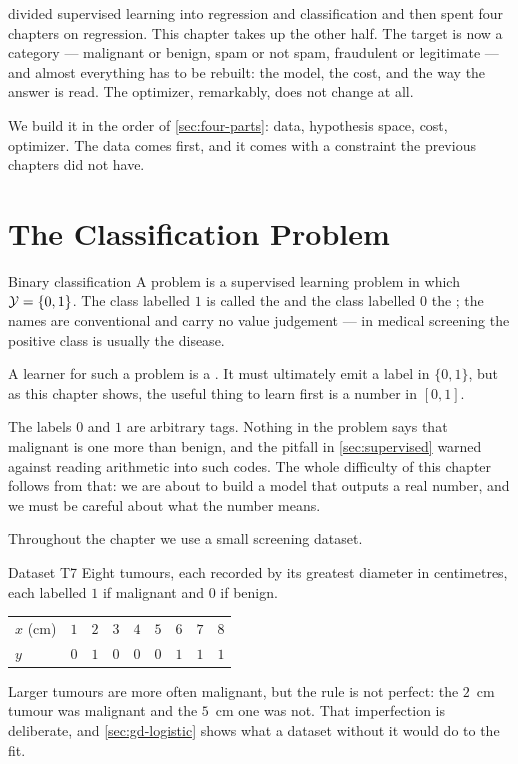  divided supervised learning into regression and classification
and then spent four chapters on regression. This chapter takes up the other
half. The target is now a category --- malignant or benign, spam or not spam,
fraudulent or legitimate --- and almost everything has to be rebuilt: the model,
the cost, and the way the answer is read. The optimizer, remarkably, does not
change at all.

We build it in the order of \cref{sec:four-parts}: data, hypothesis space, cost,
optimizer. The data comes first, and it comes with a constraint the previous
chapters did not have.

\section{The Classification Problem}
\label{sec:classification-setup}

\begin{defbox}{Binary classification}
A  problem is a supervised learning problem in which
$\mathcal{Y} = \{0,1\}$. The class labelled $1$ is called the 
and the class labelled $0$ the ; the names are conventional
and carry no value judgement --- in medical screening the positive class is
usually the disease.

A learner for such a problem is a . It must ultimately emit a
label in $\{0,1\}$, but as this chapter shows, the useful thing to learn first is
a number in $[0,1]$.
\end{defbox}

The labels $0$ and $1$ are arbitrary tags. Nothing in the problem says that
malignant is one more than benign, and the pitfall in \cref{sec:supervised}
warned against reading arithmetic into such codes. The whole difficulty of this
chapter follows from that: we are about to build a model that outputs a real
number, and we must be careful about what the number means.

Throughout the chapter we use a small screening dataset.

\begin{defbox}{Dataset T7}
Eight tumours, each recorded by its greatest diameter in centimetres, each
labelled $1$ if malignant and $0$ if benign.

\begin{center}
\small
\renewcommand{\arraystretch}{1.15}
\begin{tabular}{@{}l*{8}{r}@{}}
\toprule
$x$ (cm) & $1$ & $2$ & $3$ & $4$ & $5$ & $6$ & $7$ & $8$\\
$y$      & $0$ & $1$ & $0$ & $0$ & $0$ & $1$ & $1$ & $1$\\
\bottomrule
\end{tabular}
\end{center}

Larger tumours are more often malignant, but the rule is not perfect: the $2$~cm
tumour was malignant and the $5$~cm one was not. That imperfection is
deliberate, and \cref{sec:gd-logistic} shows what a dataset without it would do
to the fit.
\end{defbox}

